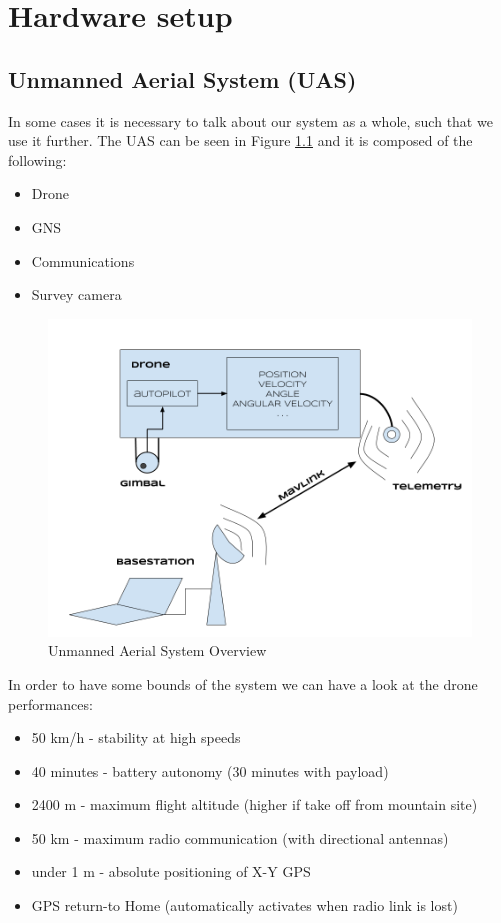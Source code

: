 \chapter{Hardware setup}\label{ch:hardwaresetup}

\section{Unmanned Aerial System (UAS)}
In some cases it is necessary to talk about our system as a whole, such that we use it further. The UAS can be seen in Figure \ref{fig:uas} and it is composed of the following:
\begin{itemize}
	\item Drone
	\item GNS
	\item Communications
	\item Survey camera
\end{itemize}

\begin{figure}[h]
	\centering
	\includegraphics[scale=0.33]{figures/uas.png}
	\caption{Unmanned Aerial System Overview}
	\label{fig:uas}
\end{figure}

In order to have some bounds of the system we can have a look at the drone performances:
\begin{itemize}
	\item 50 km/h - stability at high speeds 
	\item 40 minutes - battery autonomy (30 minutes with payload)
	\item 2400 m - maximum flight altitude (higher if take off from mountain site)
	\item 50 km - maximum radio communication (with directional antennas)
	\item under 1 m - absolute positioning of X-Y GPS
	\item GPS return-to Home (automatically activates when radio link is lost)
\end{itemize}

